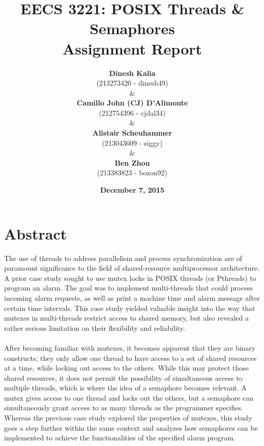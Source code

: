 \documentclass[11pt]{article}
\newcommand{\forceindent}{\leavevmode{\parindent=1em\indent}}
\begin{document}
\title{\textbf{EECS 3221: POSIX Threads \& Semaphores \\Assignment Report}}
\author{\textbf{Dinesh Kalia}\\ (213273420 - dinesh49) \\
\& \\
\textbf{Camillo John (CJ) D'Alimonte}\\ (212754396 - cjdal34) \\
\& \\
\textbf{Alistair Scheuhammer}\\ (213043609 - siggy) \\
\& \\
\textbf{Ben Zhou}\\ (213383823 - bozon92)}
\date {\textbf{December 7, 2015}}
\maketitle

\tableofcontents
\newpage
\section{Abstract}
\forceindent The use of threads to address parallelism and process synchronization are of paramount significance to the field of shared-resource multiprocessor architecture. A prior case study sought to use mutex locks in POSIX threads (or Pthreads) to program an alarm. The goal was to implement multi-threads that could process incoming alarm requests, as well as print a machine time and alarm message after certain time intervals. This case study yielded valuable insight into the way that mutexes in multi-threads restrict access to shared memory, but also revealed a rather serious limitation on their flexibility and reliability. \\
\\
\forceindent After becoming familiar with mutexes, it becomes apparent that they are binary constructs; they only allow one thread to have access to a set of shared resources at a time, while locking out access to the others. While this may protect those shared resources, it does not permit the possibility of simultaneous access to multiple threads, which is where the idea of a semaphore becomes relevant. A mutex gives access to one thread and locks out the others, but a semaphore can simultaneously grant access to as many threads as the programmer specifies. Whereas the previous case study explored the properties of mutexes, this study goes a step further within the same context and analyzes how semaphores can be implemented to achieve the functionalities of the specified alarm program.
\end{document}
